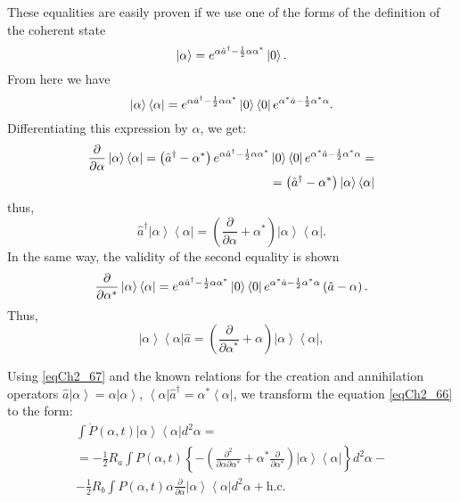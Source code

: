 These equalities are easily proven if we use one of the forms of the definition of the coherent state
\[
\left|\alpha\right> = e^{\alpha \hat{a}^{\dag} -
  \frac{1}{2}\alpha\alpha^{*}} \ket{0}.
\]
From here we have 
\[
\left|\alpha\right>\left<\alpha\right| = e^{\alpha \hat{a}^{\dag} -
  \frac{1}{2}\alpha\alpha^{*}} \ket{0}
\bra{0}e^{\alpha^{*} \hat{a} -
  \frac{1}{2}\alpha^{*}\alpha}.
\]
Differentiating this expression by $\alpha$, we get:
\begin{eqnarray}
\frac{\partial}{\partial \alpha}\left|\alpha\right>\left<\alpha\right|
= \left(\hat{a}^{\dag} -
\alpha^{*}\right) e^{\alpha \hat{a}^{\dag} -
  \frac{1}{2}\alpha\alpha^{*}} \ket{0}
\bra{0}e^{\alpha^{*} \hat{a} -
  \frac{1}{2}\alpha^{*}\alpha} = 
\nonumber \\
= \left(\hat{a}^{\dag} -
\alpha^{*}\right)\left|\alpha\right>\left<\alpha\right| 
\nonumber
\end{eqnarray}
thus,
\begin{equation}
\hat{a}^{\dag}\left|\alpha\right>\left<\alpha\right| = 
\left(\frac{\partial}{\partial \alpha} +
\alpha^{*}\right)\left|\alpha\right>\left<\alpha\right|.
\label{eqCh2_68}
\end{equation}
In the same way, the validity of the second equality is shown
\begin{eqnarray}
\frac{\partial}{\partial \alpha^{*}}\left|\alpha\right>\left<\alpha\right|
=  e^{\alpha \hat{a}^{\dag} -
  \frac{1}{2}\alpha\alpha^{*}} \ket{0}
\bra{0}e^{\alpha^{*} \hat{a} -
  \frac{1}{2}\alpha^{*}\alpha} 
\left(\hat{a} -
\alpha\right). 
\nonumber
\end{eqnarray}
Thus,
\begin{equation}
\left|\alpha\right>\left<\alpha\right|\hat{a} = 
\left(\frac{\partial}{\partial \alpha^{*}} +
\alpha\right)\left|\alpha\right>\left<\alpha\right|, 
\label{eqCh2_68a}
\end{equation}

Using \eqref{eqCh2_67} and the known relations for the creation and annihilation operators $\hat{a}\left|\alpha\right> = \alpha\left|\alpha\right>$,
$\left<\alpha\right|\hat{a}^{\dag} = \alpha^{*}\left<\alpha\right|$,
we transform the equation \eqref{eqCh2_66} to the form:   
\begin{eqnarray}
\int \dot{P}\left(\alpha,
t\right)\left|\alpha\right>\left<\alpha\right| d^2 \alpha  = 
\nonumber \\
= -\frac{1}{2}R_a\int
P\left(\alpha,t\right)
\left\{
-\left(
\frac{\partial^2}{\partial \alpha \partial \alpha^{*}} +
\alpha^{*}\frac{\partial}{\partial \alpha^{*}}
\right)
\left|\alpha\right>\left<\alpha\right| 
\right\}
d^2 \alpha - 
\nonumber \\
-\frac{1}{2}R_b\int P\left(\alpha,t\right)
\alpha \frac{\partial}{\partial \alpha}
\left|\alpha\right>\left<\alpha\right| 
d^2 \alpha + \text{h.c.}
\label{eqCh2_69}
\end{eqnarray}

